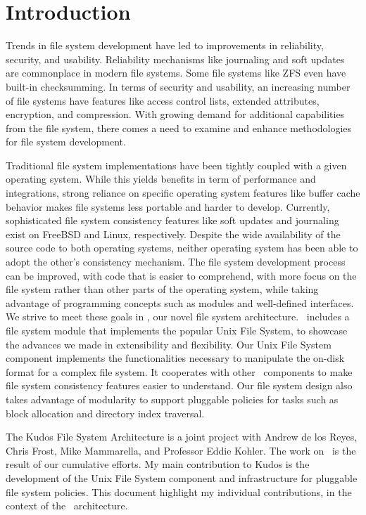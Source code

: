 
\section {Introduction}
\label{sec:intro}

Trends in file system development have led to improvements in reliability,
security, and usability. Reliability mechanisms like journaling and soft
updates are commonplace in modern file systems. Some file systems like ZFS
even have built-in checksumming. In terms of security and usability, an
increasing number of file systems have features like access control lists,
extended attributes, encryption, and compression. With growing demand for
additional capabilities from the file system, there comes a need to examine and
enhance methodologies for file system development.

Traditional file system implementations have been tightly coupled with a given
operating system.
While this yields benefits in term of performance and integrations, strong
reliance on specific operating system features like buffer cache behavior
makes file systems less portable and harder to develop. Currently,
sophisticated file system consistency features like soft updates and
journaling exist on FreeBSD and Linux, respectively. Despite the wide
availability of the source code to both operating systems, neither operating
system has been able to adopt the other's consistency mechanism.
The file system development process can be improved, with code that is easier
to comprehend, with more focus on the file system rather than other parts of
the operating system, while taking advantage of programming concepts such as
modules and well-defined interfaces. We strive to meet these goals in \Kudos,
our novel file system architecture.
\Kudos\ includes a file system module that implements the popular Unix File
System, to showcase the advances we made in extensibility and flexibility.
Our Unix File System component implements the functionalities necessary to
manipulate the on-disk format for a complex file system. It cooperates with
other \Kudos\ components to make file system consistency features easier to
understand. Our file system design also takes advantage of modularity to
support pluggable policies for tasks such as block allocation and directory
index traversal.

The Kudos File System Architecture is a joint project with Andrew de los Reyes,
Chris Frost, Mike Mammarella, and Professor Eddie Kohler. The work on
\Kudos\ is the result of our cumulative efforts. My main contribution to Kudos
is the development of the Unix File System component and infrastructure for
pluggable file system policies. This document highlight my individual
contributions, in the context of the \Kudos\ architecture.

